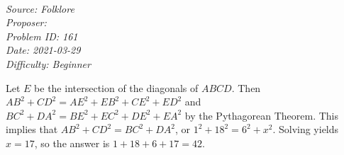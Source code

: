 \SSbreak\\
\emph{Source: Folklore}\\
\emph{Proposer: \Pflame}\\ %
\emph{Problem ID: 161}\\
\emph{Date: 2021-03-29}\\
\emph{Difficulty: Beginner}\\
\SSbreak

\bigskip

\begin{solution}\hfil\medskip
	
	Let $E$ be the intersection of the diagonals of $ABCD$. Then $AB^2 + CD^2 = AE^2 + EB^2 + CE^2 + ED^2$ and $BC^2 + DA^2 = BE^2 + EC^2 + DE^2 + EA^2$ by the Pythagorean Theorem. This implies that $AB^2 + CD^2 = BC^2 + DA^2$, or $1^2 + 18^2 = 6^2 + x^2$. Solving yields $x=17$, so the answer is $1+18+6+17=\boxed{42}$.
\end{solution}\bigskip
